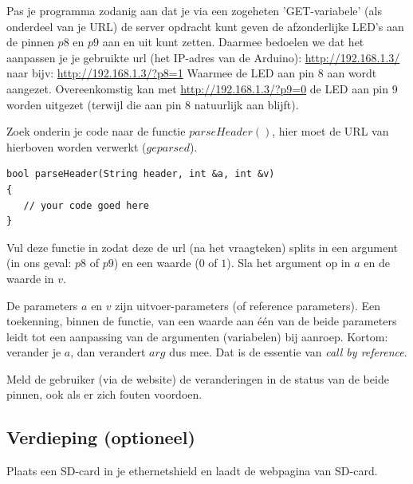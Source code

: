 \begin{exercise}
Pas je programma zodanig aan dat je via een zogeheten 'GET-variabele' (als onderdeel van je URL) de server opdracht kunt geven de afzonderlijke LED’s aan de pinnen $p8$ en $p9$ aan en uit kunt zetten. \newline \newline Daarmee bedoelen we dat het aanpassen je je gebruikte url (het IP-adres van de Arduino): \newline
\url{http://192.168.1.3/} \newline
naar bijv: \newline
\url{http://192.168.1.3/?p8=1} \newline
Waarmee de LED aan pin 8 aan wordt aangezet. Overeenkomstig kan met \newline
\url{http://192.168.1.3/?p9=0} \newline
de LED aan pin 9 worden uitgezet (terwijl die aan pin 8 natuurlijk aan blijft). \newline \par
Zoek onderin je code naar de functie $parseHeader()$, hier moet de URL van hierboven worden verwerkt ($geparsed$). 

\begin{lstlisting}[language=Arduino, numbers=none]
bool parseHeader(String header, int &a, int &v)
{
   // your code goed here 
}
\end{lstlisting}
Vul deze functie in zodat deze de url (na het vraagteken) splits in een argument (in ons geval: $p8$ of $p9$) en een waarde ($0$ of $1$). Sla het argument op in $a$ en de waarde in $v$. 

\begin{remark}
De parameters $a$ en $v$ zijn uitvoer-parameters (of reference parameters). Een toekenning, binnen de functie, van een waarde aan één van de beide parameters leidt tot een aanpassing van de argumenten (variabelen) bij aanroep. Kortom: verander je $a$, dan verandert $arg$ dus mee. Dat is de essentie van \textit{call by reference}. 
\end{remark}

Meld de gebruiker (via de website) de veranderingen in de status van de beide pinnen, ook als er zich fouten voordoen.
\end{exercise}

\subsection{Verdieping (optioneel)}
\begin{exercise}
Plaats een SD-card in je ethernetshield en laadt de webpagina van SD-card.
\end{exercise}

